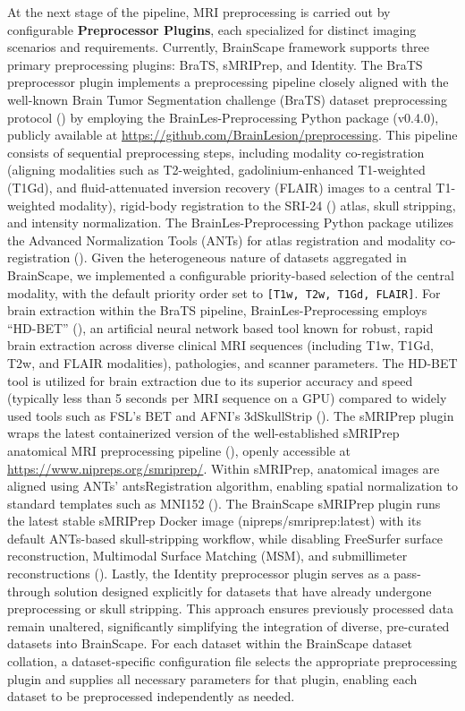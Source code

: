 At the next stage of the pipeline, MRI preprocessing is carried out by configurable \textbf{Preprocessor Plugins}, 
each specialized for distinct imaging scenarios and requirements.
Currently, BrainScape framework supports three primary preprocessing plugins: BraTS, sMRIPrep, and Identity. 
The BraTS preprocessor plugin implements a preprocessing pipeline closely aligned with the well-known 
Brain Tumor Segmentation challenge (BraTS) dataset preprocessing protocol (\cite{menze2014multimodal}) by 
employing the BrainLes-Preprocessing Python package (v0.4.0), publicly available at \url{https://github.com/BrainLesion/preprocessing}. 
This pipeline consists of sequential preprocessing steps, including modality co-registration 
(aligning modalities such as T2-weighted, gadolinium-enhanced T1-weighted (T1Gd), and fluid-attenuated inversion recovery (FLAIR) images to a central T1-weighted modality), 
rigid-body registration to the SRI-24 (\cite{rohlfing2010sri24}) atlas, skull stripping, and intensity normalization. 
The BrainLes-Preprocessing Python package utilizes the Advanced Normalization Tools (ANTs) 
for atlas registration and modality co-registration (\cite{tustison2021antsx}). 
Given the heterogeneous nature of datasets aggregated in BrainScape, 
we implemented a configurable priority-based selection of the central modality, 
with the default priority order set to \texttt{[T1w, T2w, T1Gd, FLAIR]}. 
For brain extraction within the BraTS pipeline, BrainLes-Preprocessing employs ``HD-BET'' (\cite{isensee2019automated}), 
an artificial neural network based tool known for robust, rapid brain extraction across diverse 
clinical MRI sequences (including T1w, T1Gd, T2w, and FLAIR modalities), pathologies, and scanner parameters. 
The HD-BET tool is utilized for brain extraction due to 
its superior accuracy and speed (typically less than 5 seconds per MRI sequence on a GPU) 
compared to widely used tools such as FSL's BET and AFNI's 3dSkullStrip (\cite{isensee2019automated, smith2000bet}).
The sMRIPrep plugin wraps the latest containerized version of the well-established sMRIPrep anatomical MRI preprocessing pipeline (\cite{esteban2021smriprep}), 
openly accessible at \url{https://www.nipreps.org/smriprep/}. 
Within sMRIPrep, anatomical images are aligned using ANTs' antsRegistration algorithm, 
enabling spatial normalization to standard templates such as MNI152 (\cite{avants2008symmetric,avants2011reproducible}).
The BrainScape sMRIPrep plugin runs the latest stable sMRIPrep Docker image (nipreps/smriprep:latest) with its default ANTs-based skull-stripping workflow, 
while disabling FreeSurfer surface reconstruction, Multimodal Surface Matching (MSM), and submillimeter reconstructions 
(\cite{esteban2021smriprep}).
Lastly, the Identity preprocessor plugin serves as a pass-through solution designed explicitly for datasets that 
have already undergone preprocessing or skull stripping. 
This approach ensures previously processed data remain unaltered, significantly simplifying the integration of diverse, 
pre-curated datasets into BrainScape.
For each dataset within the BrainScape dataset collation, 
a dataset-specific configuration file selects the appropriate preprocessing plugin 
and supplies all necessary parameters for that plugin, 
enabling each dataset to be preprocessed independently as needed.

